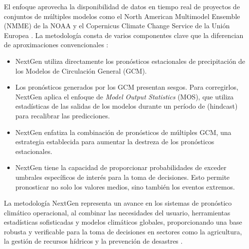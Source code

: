 El enfoque aprovecha la disponibilidad de datos en tiempo real de proyectos de conjuntos de múltiples modelos como el North American Multimodel Ensemble (NMME) de la NOAA y el Copernicus Climate Change Service de la Unión Europea \citep{cirohnext}. La metodología consta de varios componentes clave que la diferencian de aproximaciones convencionales \citep{irinext, munoznext, malawi}:
\begin{itemize}
	\item NextGen utiliza directamente los pronósticos estacionales de precipitación de los Modelos de Circulación General (GCM).
	
	\item Los pronósticos generados por los GCM presentan sesgos. Para corregirlos, NextGen aplica el enfoque de \textit{Model Output Statistics} (MOS), que utiliza estadísticas de las salidas de los modelos durante un período de (hindcast) para recalibrar las predicciones.
	
	\item NextGen enfatiza la combinación de pronósticos de múltiples GCM, una estrategia establecida para aumentar la destreza de los pronósticos estacionales.
	
	\item NextGen tiene la capacidad de proporcionar probabilidades de exceder umbrales específicos de interés para la toma de decisiones. Esto permite pronosticar no solo los valores medios, sino también los eventos extremos.
\end{itemize}

La metodología NextGen representa un avance en los sistemas de pronóstico climático operacional, al combinar las necesidades del usuario, herramientas estadísticas sofisticadas y modelos climáticos globales, proporcionando una base robusta y verificable para la toma de decisiones en sectores como la agricultura, la gestión de recursos hídricos y la prevención de desastres \citep{ponsnext}.
